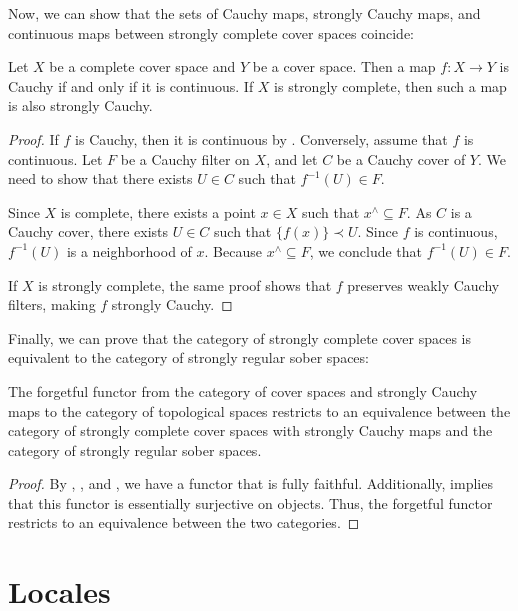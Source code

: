 \documentclass[reqno]{amsart}
\theoremstyle{definition}
\theoremstyle{remark}
\numberwithin{figure}{section}
\newcommand{\rb}{\prec}
\begin{document}
Now, we can show that the sets of Cauchy maps, strongly Cauchy maps, and continuous maps between strongly complete cover spaces coincide:

\begin{prop}
Let $X$ be a complete cover space and $Y$ be a cover space.
Then a map $f : X \to Y$ is Cauchy if and only if it is continuous.
If $X$ is strongly complete, then such a map is also strongly Cauchy.
\end{prop}
\begin{proof}
If $f$ is Cauchy, then it is continuous by .
Conversely, assume that $f$ is continuous.
Let $F$ be a Cauchy filter on $X$, and let $C$ be a Cauchy cover of $Y$.
We need to show that there exists $U \in C$ such that $f^{-1}(U) \in F$.

Since $X$ is complete, there exists a point $x \in X$ such that $x^\wedge \subseteq F$.
As $C$ is a Cauchy cover, there exists $U \in C$ such that $\{ f(x) \} \rb U$.
Since $f$ is continuous, $f^{-1}(U)$ is a neighborhood of $x$.
Because $x^\wedge \subseteq F$, we conclude that $f^{-1}(U) \in F$.

If $X$ is strongly complete, the same proof shows that $f$ preserves weakly Cauchy filters, making $f$ strongly Cauchy.
\end{proof}

Finally, we can prove that the category of strongly complete cover spaces is equivalent to the category of strongly regular sober spaces:

\begin{thm}
The forgetful functor from the category of cover spaces and strongly Cauchy maps to the category of topological spaces restricts to an equivalence between the category of strongly complete cover spaces with strongly Cauchy maps and the category of strongly regular sober spaces.
\end{thm}
\begin{proof}
By , , and , we have a functor that is fully faithful.
Additionally,  implies that this functor is essentially surjective on objects.
Thus, the forgetful functor restricts to an equivalence between the two categories.
\end{proof}

\section{Locales}
\label{sec:locales}
\end{document}
